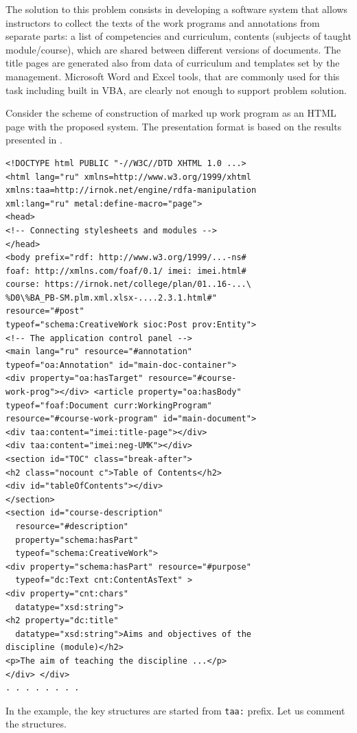 \documentclass[conference,a4paper]{IEEEtran}
\begin{document}
The solution to this problem consists in developing a software system that allows instructors to collect the texts of the work programs and annotations from separate parts: a list of competencies and curriculum, contents (subjects of taught module/course), which are shared between different versions of documents.  The title pages are generated also from data of curriculum and templates set by the management.  Microsoft Word and Excel tools, that are commonly used for this task including built in VBA, are clearly not enough to support problem solution.

Consider the scheme of construction of marked up work program as an HTML page with the proposed system.  The presentation format is based on the results presented in \cite{b14}.\\[-1em]

\begin{verbatim}
<!DOCTYPE html PUBLIC "-//W3C//DTD XHTML 1.0 ...>
<html lang="ru" xmlns=http://www.w3.org/1999/xhtml
xmlns:taa=http://irnok.net/engine/rdfa-manipulation
xml:lang="ru" metal:define-macro="page">
<head>
<!-- Connecting stylesheets and modules -->
</head>
<body prefix="rdf: http://www.w3.org/1999/...-ns#
foaf: http://xmlns.com/foaf/0.1/ imei: imei.html#
course: https://irnok.net/college/plan/01..16-...\
%D0\%BA_PB-SM.plm.xml.xlsx-....2.3.1.html#"
resource="#post"
typeof="schema:CreativeWork sioc:Post prov:Entity">
<!-- The application control panel -->
<main lang="ru" resource="#annotation"
typeof="oa:Annotation" id="main-doc-container">
<div property="oa:hasTarget" resource="#course-
work-prog"></div> <article property="oa:hasBody"
typeof="foaf:Document curr:WorkingProgram"
resource="#course-work-program" id="main-document">
<div taa:content="imei:title-page"></div>
<div taa:content="imei:neg-UMK"></div>
<section id="TOC" class="break-after">
<h2 class="nocount c">Table of Contents</h2>
<div id="tableOfContents"></div>
</section>
<section id="course-description"
  resource="#description"
  property="schema:hasPart"
  typeof="schema:CreativeWork">
<div property="schema:hasPart" resource="#purpose"
  typeof="dc:Text cnt:ContentAsText" >
<div property="cnt:chars"
  datatype="xsd:string">
<h2 property="dc:title"
  datatype="xsd:string">Aims and objectives of the
discipline (module)</h2>
<p>The aim of teaching the discipline ...</p>
</div> </div>
. . . . . . . .
\end{verbatim}

In the example, the key structures are started from \texttt{taa:} prefix. Let us comment the structures.
\end{document}
